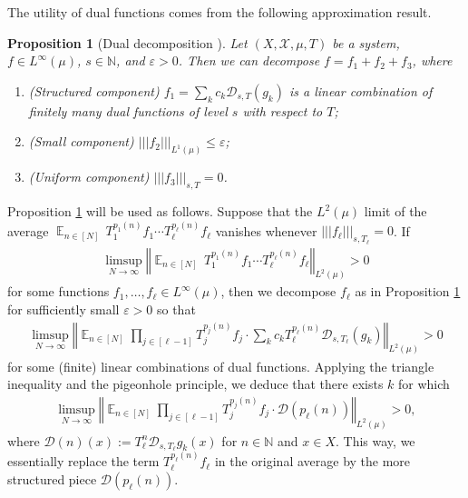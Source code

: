 \documentclass[11pt]{amsart}
\newtheorem{proposition}[lemma]{Proposition}
\theoremstyle{definition}
\newcommand{\N}{{\mathbb N}}
\newcommand{\CD}{{\mathcal D}}
\newcommand{\CX}{{\mathcal X}}
\newcommand{\norm}[1]{\left\Vert #1\right\Vert}
\newcommand{\nnorm}[1]{\lvert\!|\!| #1|\!|\!\rvert}
\DeclareMathOperator*{\E}{\mathbb{E}}
\begin{document}
The utility of dual functions comes from the following approximation result.
\begin{proposition}[Dual decomposition {\cite[Proposition 3.4]{Fr15a}}]\label{dual decomposition}
    Let $(X, \CX, \mu, T)$ be a system, $f\in L^\infty(\mu)$, $s\in\N$, and $\varepsilon>0$. Then we can decompose $f = f_1 + f_2 + f_3$, where
    \begin{enumerate}
        \item (Structured component) $f_1 = \sum_k c_k \CD_{s, T}(g_k)$ is a linear combination of finitely many dual functions of level $s$ with respect to $T$;
        \item (Small component) $\nnorm{f_2}_{L^1(\mu)}\leq \varepsilon$;
        \item (Uniform component) $\nnorm{f_3}_{s, T} = 0$.
    \end{enumerate}
\end{proposition}
Proposition \ref{dual decomposition} will be used as follows. Suppose that the $L^2(\mu)$ limit of the average $\E_{n\in[N]}\, T_1^{p_1(n)}f_1 \cdots T_\ell^{p_\ell(n)}f_\ell$ vanishes whenever $\nnorm{f_\ell}_{s, T_\ell} = 0$. If
\begin{align*}
    \limsup_{N\to\infty}\norm{\E_{n\in[N]}\, T_1^{p_1(n)}f_1 \cdots T_\ell^{p_\ell(n)}f_\ell}_{L^2(\mu)}>0
\end{align*}
for some functions $f_1, \ldots, f_\ell\in L^\infty(\mu)$, then we decompose $f_\ell$ as in Proposition \ref{dual decomposition} for sufficiently small $\varepsilon>0$ so that
\begin{align*}
    \limsup_{N\to\infty}\norm{\E_{n\in[N]}\prod_{j\in[\ell-1]}T_j^{p_j(n)}f_j \cdot \sum_k c_k T_\ell^{p_\ell(n)}\CD_{s, T_\ell}(g_k)}_{L^2(\mu)}>0
\end{align*}
for some (finite) linear combinations of dual functions. Applying the triangle inequality and the pigeonhole principle, we deduce that there exists $k$ for which
\begin{align*}
    \limsup_{N\to\infty}\norm{\E_{n\in[N]}\prod_{j\in[\ell-1]}T_j^{p_j(n)}f_j \cdot \CD(p_\ell(n))}_{L^2(\mu)}>0,
\end{align*}
where $\CD(n)(x) := T_\ell^{n}\CD_{s, T_\ell}g_k(x)$ for $n\in\N$ and $x\in X$. This way, we essentially replace the term $T_\ell^{p_\ell(n)}f_\ell$ in the original average by the  more structured piece $\CD(p_\ell(n))$.
\end{document}
